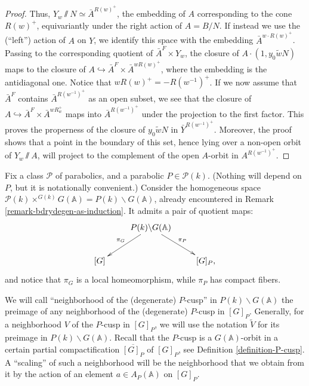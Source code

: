 \begin{proof}
Thus, $Y_w\sslash N \simeq \bar A^{R(w)^+}$, the embedding of $A$ corresponding to the cone $R(w)^+$, equivariantly under the right action of $A=B/N$. If instead we use the (``left'') action of $A$ on $Y$, we identify this space with the embedding $\bar A^{w\cdot R(w)^+}$.
Passing to the corresponding quotient of $\bar A^F \times Y_w$,  the closure of $A\cdot (1,y_0\tilde w N)$ maps to the closure of $A\hookrightarrow \bar A^F \times \bar A^{w R(w)^+}$, where the embedding is the antidiagonal one. Notice that $w R(w)^+ = -R(w^{-1})^+$.
If we now assume that $\bar A^F$ contains $\bar A^{R(w^{-1})^+}$ as an open subset, we see that the closure of $A\hookrightarrow \bar A^F \times \bar A^{wR_{w}^+}$ maps into $\bar A^{R(w^{-1})^+}$ under the projection to the first factor. This proves the properness of the closure of $y_0 \tilde w N$ in $\bar Y^{R(w^{-1})^+}$. Moreover, the proof shows that a point in the boundary of this set, hence lying over a non-open orbit of $Y_w\sslash A$, will project to the complement of the open $A$-orbit in $A^{R(w^{-1})^+}$. 
\end{proof}




Fix a class $\mathcal P$ of parabolics, and a parabolic $P\in \mathcal P(k)$. (Nothing will depend on $P$, but it is notationally convenient.)
Consider the homogeneous space $\mathcal P(k)\times^{G(k)} G(\mathbb A) = P(k)\backslash G(\mathbb A)$, already encountered in Remark \ref{remark-bdrydegen-as-induction}. It admits a pair of quotient maps:
\begin{equation}
\label{equation-leftright} 
\xymatrix{
& P(k)\backslash G(\mathbb A) \ar[dl]_{\pi_G}\ar[dr]^{\pi_P}& \\
[G] && [G]_P,
}\end{equation}
and notice that $\pi_G$ is a local homeomorphism, while $\pi_P$ has compact fibers.


We will call ``neighborhood of the (degenerate) $P$-cusp'' in $P(k)\backslash G(\mathbb A)$ the preimage of any neighborhood of the (degenerate) $P$-cusp in $[G]_P$. Generally, for a neighborhood $V$ of the $P$-cusp in $[G]_P$, we will use the notation $\tilde V$ for its preimage in $P(k)\backslash G(\mathbb A)$. Recall that the $P$-cusp is a $G(\mathbb A)$-orbit in a certain partial compactification $\overline{[G]_P}$ of $[G]_P$, see Definition \ref{definition-P-cusp}. A ``scaling'' of such a neighborhood will be the neighborhood that we obtain from it by the action of an element $a\in A_P(\mathbb A)$ on $[G]_P$.


